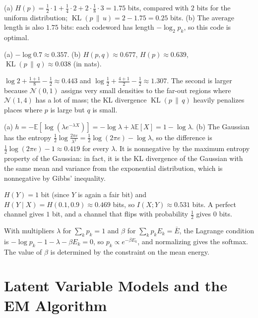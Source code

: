\documentclass[11pt]{article}
\newcommand{\E}{\mathbb{E}}
\DeclareMathOperator{\KL}{KL}
\begin{document}
\begin{description}[leftmargin=0pt, itemsep=0.3em]
    \item[\ref{pr:entropy-code}.] (a) $H(p) = \frac{1}{2} \cdot 1 + \frac{1}{4} \cdot 2 + 2 \cdot \frac{1}{8} \cdot 3 = 1.75$ bits, compared with $2$ bits for the uniform distribution; $\KL(p \,\|\, u) = 2 - 1.75 = 0.25$ bits. (b) The average length is also $1.75$ bits: each codeword has length $-\log_2 p_k$, so this code is optimal.
    \item[\ref{pr:cross-entropy}.] (a) $-\log 0.7 \approx 0.357$. (b) $H(p, q) \approx 0.677$, $H(p) \approx 0.639$, $\KL(p \,\|\, q) \approx 0.038$ (in nats).
    \item[\ref{pr:kl-gauss-practice}.] $\log 2 + \frac{1 + 1}{8} - \frac{1}{2} \approx 0.443$ and $\log\frac{1}{2} + \frac{4 + 1}{2} - \frac{1}{2} \approx 1.307$. The second is larger because $\mathcal{N}(0, 1)$ assigns very small densities to the far-out regions where $\mathcal{N}(1, 4)$ has a lot of mass; the KL divergence $\KL(p \,\|\, q)$ heavily penalizes places where $p$ is large but $q$ is small.
    \item[\ref{pr:exp-entropy}.] (a) $h = -\E[\log(\lambda e^{-\lambda X})] = -\log\lambda + \lambda\E[X] = 1 - \log\lambda$. (b) The Gaussian has the entropy $\frac{1}{2}\log\frac{2\pi e}{\lambda^2} = \frac{1}{2}\log(2\pi e) - \log\lambda$, so the difference is $\frac{1}{2}\log(2\pi e) - 1 \approx 0.419$ for every $\lambda$. It is nonnegative by the maximum entropy property of the Gaussian: in fact, it is the KL divergence of the Gaussian with the same mean and variance from the exponential distribution, which is nonnegative by Gibbs' inequality.
    \item[\ref{pr:channel}.] $H(Y) = 1$ bit (since $Y$ is again a fair bit) and $H(Y \mid X) = H(0.1, 0.9) \approx 0.469$ bits, so $I(X; Y) \approx 0.531$ bits. A perfect channel gives $1$ bit, and a channel that flips with probability $\frac{1}{2}$ gives $0$ bits.
    \item[\ref{pr:max-entropy-softmax}.] With multipliers $\lambda$ for $\sum_k p_k = 1$ and $\beta$ for $\sum_k p_k E_k = \bar E$, the Lagrange condition is $-\log p_k - 1 - \lambda - \beta E_k = 0$, so $p_k \propto e^{-\beta E_k}$, and normalizing gives the softmax. The value of $\beta$ is determined by the constraint on the mean energy.
\end{description}

\section*{Latent Variable Models and the EM Algorithm}
\end{document}
